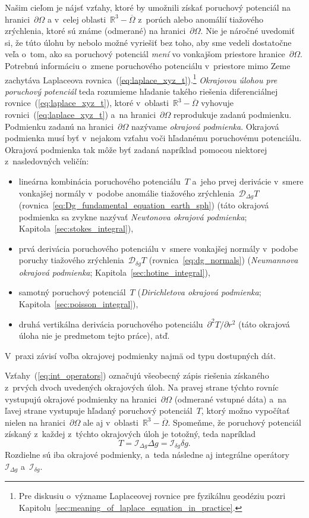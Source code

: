 \documentclass[a4paper, 12pt]{book}
\newcommand{\DIFF}{\mathcal D}
\newcommand{\INT}{\mathcal I}
\begin{document}
Našim cieľom je nájsť vzťahy, ktoré by umožnili získať poruchový potenciál na 
hranici~$\partial \Omega$ a v~celej oblasti~$\mathbb{R}^3 - \overline{\Omega}$ 
z~porúch alebo anomálií tiažového zrýchlenia, ktoré sú známe (odmerané) na 
hranici~$\partial \Omega$.  Nie je náročné uvedomiť si, že túto úlohu by nebolo 
možné vyriešiť bez toho, aby sme vedeli dostatočne veľa o~tom, ako sa poruchový 
potenciál \emph{mení} vo vonkajšom priestore hranice~$\partial\Omega$.  
Potrebnú informáciu o~zmene poruchového potenciálu v~priestore mimo Zeme 
zachytáva Laplaceova rovnica~(\ref{eq:laplace_xyz_t}).\footnote{Pre diskusiu 
o~význame Laplaceovej rovnice pre fyzikálnu geodéziu pozri 
Kapitolu~\ref{sec:meaning_of_laplace_equation_in_practice}.}  \emph{Okrajovou 
úlohou pre poruchový potenciál} teda rozumieme hľadanie takého riešenia 
diferenciálnej rovnice~(\ref{eq:laplace_xyz_t}), ktoré v~oblasti~$\mathbb{R}^3 
- \overline\Omega$ vyhovuje rovnici~(\ref{eq:laplace_xyz_t}) a~na 
hranici~$\partial \Omega$ reprodukuje zadanú podmienku.  Podmienku zadanú na 
hranici~$\partial \Omega$ nazývame \emph{okrajová podmienka}.  Okrajová 
podmienka musí byť v~nejakom vzťahu voči hľadanému poruchovému potenciálu.  
Okrajová podmienka tak môže byť zadaná napríklad pomocou niektorej 
z~nasledovných veličín:
%
\begin{itemize}
\item lineárna kombinácia poruchového potenciálu~$T$ a~jeho prvej derivácie 
v~smere vonkajšej normály v~podobe anomálie tiažového zrýchlenia~$\DIFF_{\Delta 
g}T$ (rovnica~\ref{eq:Dg_fundamental_equation_earth_sph}) (táto okrajová 
podmienka sa zvykne nazývať \emph{Newtonova okrajová podmienka}; 
Kapitola~\ref{sec:stokes_integral}),
%
\item prvá derivácia poruchového potenciálu v~smere vonkajšej normály v~podobe 
poruchy tiažového zrýchlenia~$\DIFF_{\delta g} T$ (rovnica~\ref{eq:dg_normals}) 
(\emph{Neumannova okrajová podmienka}; Kapitola~\ref{sec:hotine_integral}),
%
\item samotný poruchový potenciál~$T$ (\emph{Dirichletova okrajová podmienka}; 
Kapitola~\ref{sec:poisson_integral}),
%
\item druhá vertikálna derivácia poruchového potenciálu~$\partial^2 
T / \partial r^2$ (táto okrajová úloha nie je predmetom tejto práce), atď.
\end{itemize}
%
V~praxi závisí voľba okrajovej podmienky najmä od typu dostupných dát.

Vzťahy~(\ref{eq:int_operators}) označujú všeobecný zápis riešenia získaného 
z~prvých dvoch uvedených okrajových úloh.  Na pravej strane týchto rovníc 
vystupujú okrajové podmienky na hranici~$\partial \Omega$ (odmerané vstupné 
dáta) a~na ľavej strane vystupuje hľadaný poruchový potenciál~$T$, ktorý možno 
vypočítať nielen na hranici~$\partial\Omega$ ale aj v~oblasti~$\mathbb{R}^3 
- \overline\Omega$.  Spomeňme, že poruchový potenciál získaný z~každej z~týchto 
okrajových úloh je totožný, teda napríklad
%
\begin{equation}
T = \INT_{\Delta g} \Delta g = \INT_{\delta g}\delta g{.}
\end{equation}
%
Rozdielne sú iba okrajové podmienky, a~teda následne aj integrálne 
operátory~$\INT_{\Delta g}$ a~$\INT_{\delta g}$.
\end{document}
